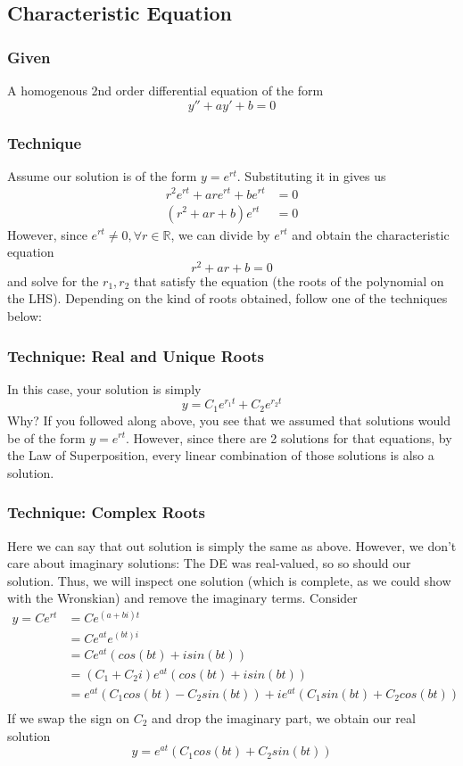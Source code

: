 \documentclass[11pt]{article}
\begin{document}
\subsection{Characteristic Equation }
\subsubsection{Given}
A homogenous 2nd order differential equation of the form 
\[ y'' + ay' + b = 0 \]
\subsubsection{Technique}
Assume our solution is of the form $y = e^{rt}$. Substituting it in gives us
\begin{align*}
    r^2e^{rt} + are^{rt} + be^{rt} &= 0 \\
    (r^2 + ar + b)e^{rt} &= 0
\end{align*}
However, since $e^{rt} \neq 0, \forall r \in \mathbb{R}$, we can divide by 
$e^{rt}$ and obtain the characteristic equation
    \[ r^2 + ar + b = 0 \]
and solve for the $r_1, r_2$ that satisfy the equation (the roots of the polynomial on the LHS). Depending
on the kind of roots obtained, follow one of the techniques below:
\subsubsection{Technique: Real and Unique Roots}
In this case, your solution is simply
    \[ y = C_1e^{r_1t} + C_2e^{r_2t} \]
Why? If you followed along above, you see that we assumed that solutions would be of the form $y = e^{rt}$.
However, since there are 2 solutions for that equations, by the Law of Superposition, every linear 
combination of those solutions is also a solution.
\subsubsection{Technique: Complex Roots}
Here we can say that out solution is simply the same as above. However, we don't care about imaginary 
solutions: The DE was real-valued, so so should our solution. Thus, we will inspect one solution (which
is complete, as we could show with the Wronskian) and remove the imaginary terms. Consider
\begin{align*}
    y = Ce^{rt} &= Ce^{(a+bi)t} \\
    &= Ce^{at}e^{(bt)i} \\
    &= Ce^{at}(cos(bt) + isin(bt)) \\
    &= (C_1 + C_2i)e^{at}(cos(bt) + isin(bt)) \\
    &= e^{at}(C_1cos(bt) - C_2sin(bt)) + ie^{at}(C_1sin(bt) + C_2cos(bt))\\
\end{align*}
If we swap the sign on $C_2$ and drop the imaginary part, we obtain our real solution
\[ y = e^{at}(C_1cos(bt) + C_2sin(bt)) \]
\end{document}
